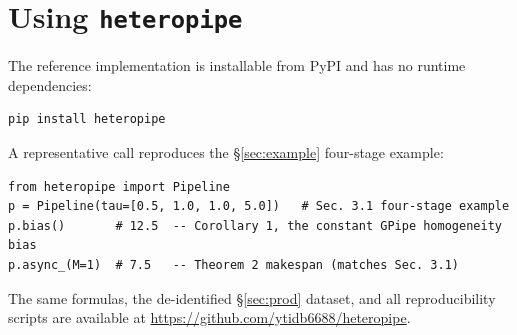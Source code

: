 \documentclass[11pt]{article}
\begin{document}
\section*{Using \texttt{heteropipe}}

The reference implementation is installable from PyPI and has no runtime dependencies:
\begin{verbatim}
pip install heteropipe
\end{verbatim}
A representative call reproduces the \S\ref{sec:example} four-stage example:
\begin{verbatim}
from heteropipe import Pipeline
p = Pipeline(tau=[0.5, 1.0, 1.0, 5.0])   # Sec. 3.1 four-stage example
p.bias()       # 12.5  -- Corollary 1, the constant GPipe homogeneity bias
p.async_(M=1)  # 7.5   -- Theorem 2 makespan (matches Sec. 3.1)
\end{verbatim}
The same formulas, the de-identified \S\ref{sec:prod} dataset, and all reproducibility scripts are available at \url{https://github.com/ytidb6688/heteropipe}.
\end{document}
